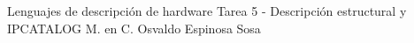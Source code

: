 




	\pnormal
	{Lenguajes de descripción de hardware}
	{Tarea 5 - Descripción estructural y IPCATALOG}
	{M. en C. Osvaldo Espinosa Sosa}
	\tableofcontents
	
	\newpage 
	\newpage 
	\clearpage 
	\clearpage 
	\newpage 



